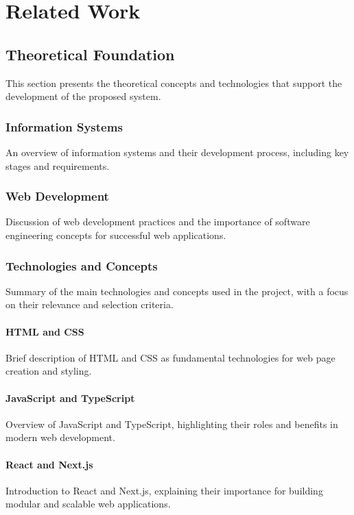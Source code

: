 
\chapter{Related Work}\label{cap:related_work}

\section{Theoretical Foundation}
This section presents the theoretical concepts and technologies that support the development of the proposed system.

\subsection{Information Systems}
An overview of information systems and their development process, including key stages and requirements.

\subsection{Web Development}
Discussion of web development practices and the importance of software engineering concepts for successful web applications.

\subsection{Technologies and Concepts}
Summary of the main technologies and concepts used in the project, with a focus on their relevance and selection criteria.

\subsubsection{HTML and CSS}
Brief description of HTML and CSS as fundamental technologies for web page creation and styling.

\subsubsection{JavaScript and TypeScript}
Overview of JavaScript and TypeScript, highlighting their roles and benefits in modern web development.

\subsubsection{React and Next.js}
Introduction to React and Next.js, explaining their importance for building modular and scalable web applications.


